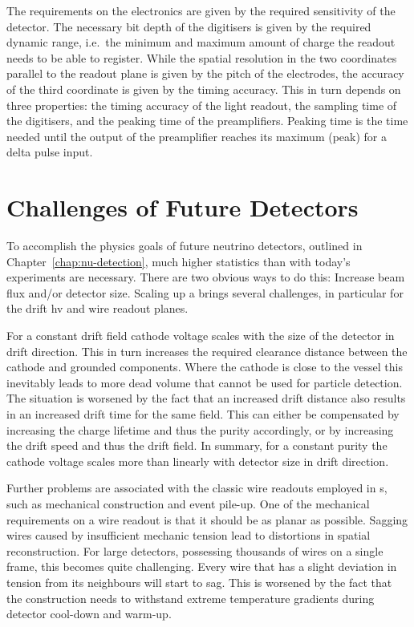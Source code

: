 The requirements on the electronics are given by the required sensitivity of the detector.
The necessary bit depth of the digitisers is given by the required dynamic range, i.e.\ the minimum and maximum amount of charge the readout needs to be able to register.
While the spatial resolution in the two coordinates parallel to the readout plane is given by the pitch of the electrodes, the accuracy of the third coordinate is given by the timing accuracy.
This in turn depends on three properties: the timing accuracy of the light readout, the sampling time of the digitisers, and the peaking time of the preamplifiers.
Peaking time is the time needed until the output of the preamplifier reaches its maximum (peak) for a delta pulse input.


\section{Challenges of Future Detectors}
\label{sec:lartpc_challenges}

To accomplish the physics goals of future neutrino detectors, outlined in Chapter~\ref{chap:nu-detection}, much higher statistics than with today's experiments are necessary.
There are two obvious ways to do this: Increase beam flux and/or detector size.
Scaling up a \lartpc{} brings several challenges, in particular for the drift \gls{hv} and wire readout planes.

For a constant drift field cathode voltage scales with the size of the detector in drift direction.
This in turn increases the required clearance distance between the cathode and grounded components.
Where the cathode is close to the \lar{} vessel this inevitably leads to more dead volume that cannot be used for particle detection.
The situation is worsened by the fact that an increased drift distance also results in an increased drift time for the same field.
This can either be compensated by increasing the charge lifetime and thus the \lar{} purity accordingly, or by increasing the drift speed and thus the drift field.
In summary, for a constant \lar{} purity the cathode voltage scales more than linearly with detector size in drift direction.

Further problems are associated with the classic wire readouts employed in \lartpc{}s, such as mechanical construction and event pile-up.
One of the mechanical requirements on a wire readout is that it should be as planar as possible.
Sagging wires caused by insufficient mechanic tension lead to distortions in spatial reconstruction.
For large detectors, possessing thousands of wires on a single frame, this becomes quite challenging.
Every wire that has a slight deviation in tension from its neighbours will start to sag.
This is worsened by the fact that the construction needs to withstand extreme temperature gradients during detector cool-down and warm-up.

